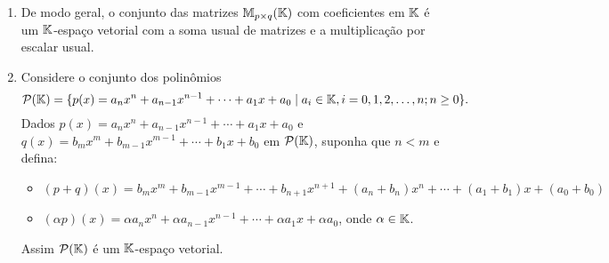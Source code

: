 \begin{exemplo}
\begin{enumerate}[label={\arabic*})]
		\item De modo geral, o conjunto das matrizes $\mathbb{M}_{p \times q}(\mathbb{K})$ com coeficientes em $\mathbb{K}$ \'e um $\mathbb{K}$-espa\c{c}o vetorial com a soma usual de matrizes e a multiplica\c{c}\~ao por escalar usual.

		\item Considere o conjunto dos polin\^omios
		      \[
			      \mathcal{P}(\mathbb{K}) = \{ p(x) = a_nx^n + a_{n - 1}x^{n - 1} + \cdots + a_1x + a_0 \mid a_i \in \mathbb{K}, i = 0, 1, 2, \dots, n; n \ge 0 \}.
		      \]
		      Dados $p(x) = a_nx^n + a_{n - 1}x^{n - 1} + \cdots + a_1x + a_0$ e $q(x) = b_mx^m + b_{m - 1}x^{m - 1} + \cdots + b_1x + b_0$ em $\mathcal{P}(\mathbb{K})$, suponha que $n < m$ e defina:
		      \begin{itemize}
			      \item $(p + q)(x) = b_mx^m + b_{m - 1}x^{m - 1} + \cdots + b_{n + 1}x^{n + 1} + (a_n + b_n)x^n + \cdots + (a_1 + b_1)x + (a_0 + b_0)$
			      \item $(\alpha p)(x) = \alpha a_nx^n + \alpha a_{n - 1}x^{n - 1} + \cdots + \alpha a_1x + \alpha a_0$, onde $\alpha \in \mathbb{K}$.
		      \end{itemize}
		      Assim $\mathcal{P}(\mathbb{K})$ \'e um $\mathbb{K}$-espa\c{c}o vetorial.


\end{enumerate}
\end{exemplo}
